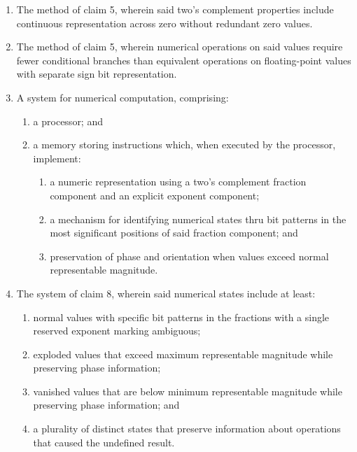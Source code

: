 \documentclass[12pt,letter]{article}
\begin{document}
\begin{enumerate}
    \item The method of claim 5, wherein said two's complement properties include continuous representation across zero without redundant zero values.
    
    \item The method of claim 5, wherein numerical operations on said values require fewer conditional branches than equivalent operations on floating-point values with separate sign bit representation.
    
    \item A system for numerical computation, comprising:
        \begin{enumerate}
            \item a processor; and
            \item a memory storing instructions which, when executed by the processor, implement:
                \begin{enumerate}
                    \item a numeric representation using a two's complement fraction component and an explicit exponent component;
                    \item a mechanism for identifying numerical states thru bit patterns in the most significant positions of said fraction component; and
                    \item preservation of phase and orientation when values exceed normal representable magnitude.
                \end{enumerate}
        \end{enumerate}
    
    \item The system of claim 8, wherein said numerical states include at least:
        \begin{enumerate}
            \item normal values with specific bit patterns in the fractions with a single reserved exponent marking ambiguous;
            \item exploded values that exceed maximum representable magnitude while preserving phase information;
            \item vanished values that are below minimum representable magnitude while preserving phase information; and
            \item a plurality of distinct states that preserve information about operations that caused the undefined result.
        \end{enumerate}
    

\end{enumerate}
\end{document}
